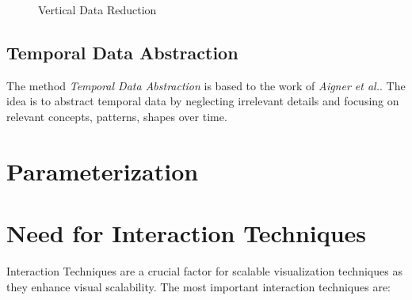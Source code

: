 \begin{figure}[H]
    \centering
    \caption{Vertical Data Reduction}
    \label{fig:my_label}
\end{figure}






\subsection{Temporal Data Abstraction}
The method \textit{Temporal Data Abstraction} is based to the work of \textit{Aigner et al.}\cite{Aigner2011}. The idea is to abstract temporal data by neglecting irrelevant details and focusing on relevant concepts, patterns, shapes over time. 



\section{Parameterization}

\section{Need for Interaction Techniques}
Interaction Techniques are a crucial factor for scalable visualization techniques as they enhance visual scalability\cite{Tegarden1999a}. The most important interaction techniques are: 
